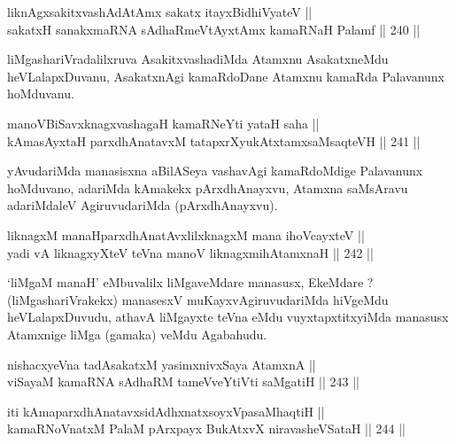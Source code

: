 \begin{shl}
liknAgxsakitxvashAdAtAmx sakatx itayxBidhiVyateV || \\
sakatxH sanakxmaRNA sAdhaRmeVtAyxtAmx kamaRNaH Palamf \hfill || 240 ||  
\end{shl}

\begin{artha}
liMgashariVradalilxruva AsakitxvashadiMda Atamxnu AsakatxneMdu
heVLalapxDuvanu, AsakatxnAgi kamaRdoDane Atamxnu kamaRda Palavanunx
hoMduvanu.
\end{artha}

\begin{shl}
manoVBiSavxknagxvashagaH kamaRNeYti yataH saha || \\
kAmasAyxtaH parxdhAnatavxM tatapxrXyukAtxtamxsaMsaqteVH \hfill || 241 ||  
\end{shl}

\begin{artha}
yAvudariMda manasisxna aBilASeya vashavAgi kamaRdoMdige
Palavanunx hoMduvano, adariMda kAmakekx pArxdhAnayxvu, Atamxna
saMsAravu adariMdaleV AgiruvudariMda (pArxdhAnayxvu).
\end{artha}


\begin{shl}
liknagxM manaHparxdhAnatAvxlilxknagxM mana ihoVcayxteV || \\
yadi vA liknagxyXteV teVna manoV liknagxmihA\s \s tamxnaH \hfill || 242 ||  
\end{shl}

\begin{artha}
`liMgaM manaH' eMbuvalilx liMgaveMdare manasusx, EkeMdare ?
(liMgashariVrakekx) manasesxV muKayxvAgiruvudariMda hiVgeMdu
heVLalapxDuvudu, athavA liMgayxte teVna eMdu vuyxtapxtitxyiMda
manasusx Atamxnige liMga (gamaka) veMdu Agabahudu.
\end{artha}

\begin{shl}
nishacxyeVna tadAsakatxM yasimxnivxSaya AtamxnA || \\
viSayaM kamaRNA sAdhaRM tameVveYtiVti saMgatiH \hfill || 243 ||  
\end{shl}

\begin{shl}
iti kAmaparxdhAnatavxsidAdhxnatxsoyxVpasaMhaqtiH || \\
kamaRNoV\s natxM PalaM pArxpayx BukAtxvX niravasheVSataH \hfill || 244 ||  
\end{shl}

